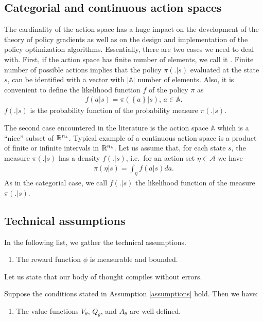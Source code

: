 \documentclass[a4paper,12pt]{amsart}
\newcommand{\actionSpace}{\mathbb A}
\newcommand{\actionSpaceAlg}{\mathcal A}
\newcommand{\stateValueFunc}{V}
\newcommand{\actionValueFunc}{Q}
\newcommand{\advantageFunc}{A}
\newcommand{\policy}{\pi}
\newcommand{\policyLik}{f}
\newcommand{\rewardFunc}{\phi}
\begin{document}
\subsection{Categorial and continuous action spaces}
The cardinality of the action space has a huge impact on the development of the
theory of policy gradients as well as on the design and implementation of
the policy optimization algorithms.
Essentially, there are two cases we need to deal with. First, if the action
space has finite number of elements, we call it . Finite
number of possible actions implies that the policy $\policy(.|s)$ evaluated at
the state $s$, can be identified with a vector with $|\actionSpace|$ number of
elements. Also, it is convenient to define the likelihood function $\policyLik$
of the policy $\policy$ as 
\begin{align*}
    \policyLik(a | s) = \policy(\left\{a \right\}|s), \, a\in \actionSpace.
\end{align*}
$\policyLik(.|s)$ is the probability function of the probability measure 
$\policy(.|s)$.

The second case encountered in the literature is the  action
space $\actionSpace$ which is a ``nice'' subset of $\R^{n_{\actionSpace}}$.
Typical example of a continuous action space is a product of finite or infinite
intervals in $\R^{n_{\actionSpace}}$. Let us assume that, for each state $s$, 
the measure $\policy(.|s)$ has a density $\policyLik(.|s)$, i.e.\ 
for an action set $\eta\in\actionSpaceAlg$ we have
\begin{align*}
    \policy(\eta | s) = \int_{\eta} \policyLik(a|s) da.
\end{align*}
As in the categorial case, we call $\policyLik(.|s)$ the likelihood function of the
measure $\policy(.|s)$.

\subsection{Technical assumptions}
In the following list, we gather the technical assumptions.
\begin{assumption}
    \begin{enumerate}
        \item The reward function $\rewardFunc$ is measurable and bounded.
    \end{enumerate}

    \label{assumptions}
\end{assumption}

Let us state that our body of thought compiles without errors.
\begin{theorem}
    Suppose the conditions stated in Assumption \ref{assumptions} hold. Then we have:
    \begin{enumerate}
        \item The value functions $\stateValueFunc_{\theta}$, 
            $\actionValueFunc_{\theta}$, and $\advantageFunc_{\theta}$ are well-defined.
    \end{enumerate}
\end{theorem}
\end{document}
